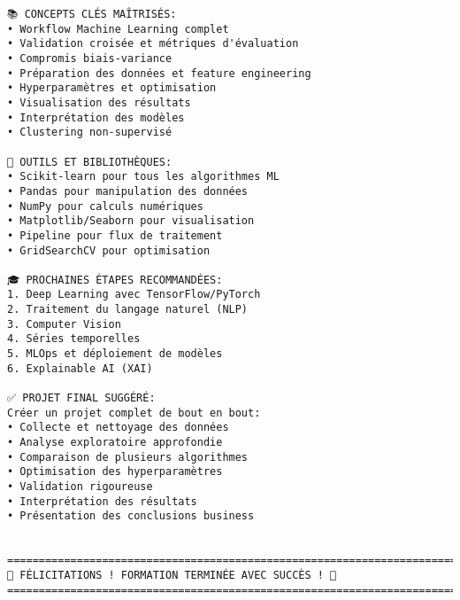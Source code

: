 \documentclass[11pt]{article}
\begin{document}
\begin{Verbatim}[commandchars=\\\{\}]
📚 CONCEPTS CLÉS MAÎTRISÉS:
• Workflow Machine Learning complet
• Validation croisée et métriques d'évaluation
• Compromis biais-variance
• Préparation des données et feature engineering
• Hyperparamètres et optimisation
• Visualisation des résultats
• Interprétation des modèles
• Clustering non-supervisé

🔧 OUTILS ET BIBLIOTHÈQUES:
• Scikit-learn pour tous les algorithmes ML
• Pandas pour manipulation des données
• NumPy pour calculs numériques
• Matplotlib/Seaborn pour visualisation
• Pipeline pour flux de traitement
• GridSearchCV pour optimisation

🎓 PROCHAINES ÉTAPES RECOMMANDÉES:
1. Deep Learning avec TensorFlow/PyTorch
2. Traitement du langage naturel (NLP)
3. Computer Vision
4. Séries temporelles
5. MLOps et déploiement de modèles
6. Explainable AI (XAI)

✅ PROJET FINAL SUGGÉRÉ:
Créer un projet complet de bout en bout:
• Collecte et nettoyage des données
• Analyse exploratoire approfondie
• Comparaison de plusieurs algorithmes
• Optimisation des hyperparamètres
• Validation rigoureuse
• Interprétation des résultats
• Présentation des conclusions business


================================================================================
🎉 FÉLICITATIONS ! FORMATION TERMINÉE AVEC SUCCÈS ! 🎉
================================================================================
    \end{Verbatim}


    
    
    
\end{document}
